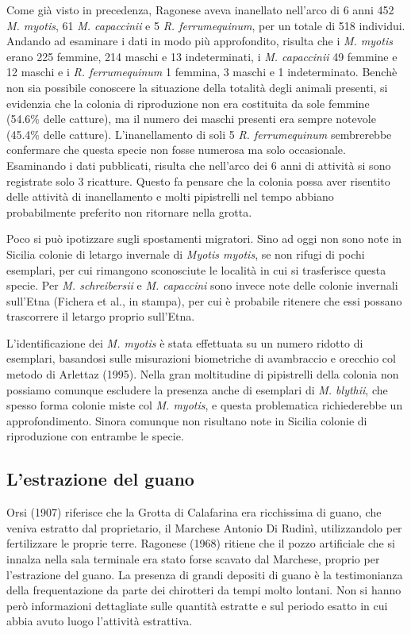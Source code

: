 \begin{multicols}{2}
Come già visto in precedenza, Ragonese aveva inanellato nell’arco di 6 anni 452 \emph{M. myotis}, 61 \emph{M. capaccinii} e 5 \emph{R. ferrumequinum}, per un totale di 518 individui. Andando ad esaminare i dati in modo più approfondito, risulta che i \emph{M. myotis} erano 225 femmine, 214 maschi e 13 indeterminati, i \emph{M. capaccinii} 49 femmine e 12 maschi e i \emph{R. ferrumequinum} 1 femmina, 3 maschi e 1 indeterminato. Benchè non sia possibile conoscere la situazione della totalità degli animali presenti, si evidenzia che la colonia di riproduzione non era costituita da sole femmine (54.6\% delle catture), ma il numero dei maschi presenti era sempre notevole (45.4\% delle catture). L’inanellamento di soli 5 \emph{R. ferrumequinum} sembrerebbe confermare che questa specie non fosse numerosa ma solo occasionale. Esaminando i dati pubblicati, risulta che nell’arco dei 6 anni di attività si sono registrate solo 3 ricatture. Questo fa pensare che la colonia possa aver risentito delle attività di inanellamento e molti pipistrelli nel tempo abbiano probabilmente preferito non ritornare nella grotta.

Poco si può ipotizzare sugli spostamenti migratori. Sino ad oggi non sono note in Sicilia colonie di letargo invernale di \emph{Myotis myotis}, se non rifugi di pochi esemplari, per cui rimangono sconosciute le località in cui si trasferisce questa specie. Per \emph{M. schreibersii} e \emph{M. capaccini} sono invece note delle colonie invernali sull’Etna (Fichera et al., in stampa), per cui è probabile ritenere che essi possano trascorrere il letargo proprio sull’Etna. 

L’identificazione dei \emph{M. myotis} è stata effettuata su un numero ridotto di esemplari, basandosi sulle misurazioni biometriche di avambraccio e orecchio col metodo di Arlettaz (1995). Nella gran moltitudine di pipistrelli della colonia non possiamo comunque escludere la presenza anche di esemplari di \emph{M. blythii}, che spesso forma colonie miste col \emph{M. myotis}, e questa problematica richiederebbe un approfondimento. Sinora comunque non risultano note in Sicilia colonie di riproduzione con entrambe le specie.

\subsection*{L’estrazione del guano}
Orsi (1907) riferisce che la Grotta di Calafarina era ricchissima di guano, che veniva estratto dal proprietario, il Marchese Antonio Di Rudinì, utilizzandolo per fertilizzare le proprie terre. Ragonese (1968) ritiene che il pozzo artificiale che si innalza nella sala terminale era stato forse scavato dal Marchese, proprio per l’estrazione del guano. La presenza di grandi depositi di guano è la testimonianza della frequentazione da parte dei chirotteri da tempi molto lontani. Non si hanno però informazioni dettagliate sulle quantità estratte e sul periodo esatto in cui abbia avuto luogo l’attività estrattiva. 


\end{multicols}
